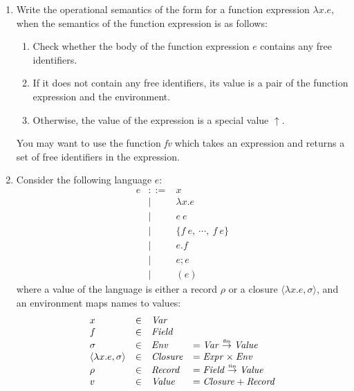 \begin{enumerate}
\item Write the operational semantics of the form
 for a function expression
$\lambda x. e$, when the semantics of the function expression
is as follows:
\begin{enumerate}
\item Check whether the body of the function expression $e$ contains
any free identifiers.
\item If it does not contain any free identifiers, its value is a pair
  of the function expression and the environment.
\item Otherwise, the value of the expression is a special value $\uparrow$.
\end{enumerate}
You may want to use the function \textit{fv} which takes an
expression and returns a set of free identifiers in the expression.

\item Consider the following language $e$:
\begin{equation*}
\begin{array}{llll}
e & ::= 
& x \\
& \mid & \lambda x.e \\
& \mid & e\ e \\
& \mid & \{f\ e,\ \cdots,\ f\ e\}\\
& \mid & e.f \\
& \mid & e; e \\
& \mid & (e)
\end{array}
\end{equation*}
where a value of the language is either a record $\rho$
or a closure $\langle\lambda x. e,\sigma\rangle$, and
an environment maps names to values:
\begin{equation*}
\begin{gathered}
\begin{array}{llll}
x & \in & \mbox{\emph{Var}}\\
f & \in & \mbox{\emph{Field}}\\
\sigma & \in & \mbox{\emph{Env}} & = \mbox{\emph{Var}} \stackrel{\mbox{\tiny fin}}{\to} \mbox{\emph{Value}}\\
\langle\lambda x.e, \sigma\rangle & \in & \mbox{\emph{Closure}} & = \mbox{\emph{Expr}} \times \mbox{\emph{Env}}\\
\rho & \in & \mbox{\emph{Record}} & = \mbox{\emph{Field}} \stackrel{\mbox{\tiny fin}}{\to} \mbox{\emph{Value}} \\
v & \in & \mbox{\emph{Value}} & = \mbox{\emph{Closure}} + \mbox{\emph{Record}}\\
\end{array}
\end{gathered}
\end{equation*}


\end{enumerate}
